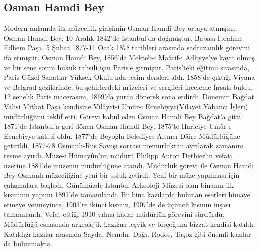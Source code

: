 \subsection{Osman Hamdi Bey}
\indent\indent Modern anlamda ilk müzecilik girişimin Osman Hamdi Bey ortaya atmıştır. Osman Hamdi Bey, 10 Aralık 1842'de İstanbul'da doğmuştur. Babası İbrahim Edhem Paşa, 5 Şubat 1877-11 Ocak 1878 tarihleri arasında sadrazamlık görevini ifa etmiştir. Osman Hamdi Bey, 1856'da Mekteb-i Ma\^{a}rif-i Adliyye'ye kayıt olmuş ve bir sene sonra hukuk tahsili için Paris'e gitmiştir. Paris'teki eğitimi sırasında, Paris Güzel Sanatlar Yüksek Okulu'nda resim dersleri aldı. 1858'de çıktığı Viyana ve Belgrad gezilerinde, bu şehirlerdeki müzeleri ve sergileri inceleme fırsatı buldu. 12 senelik Paris macerasını, 1869'da yurda dönerek sona erdirdi. Dönemin Bağdat Valisi Mithat Paşa kendisine Vil\^{a}yet-i Um\^{u}r-ı Ecnebiyye(Vilayet Yabancı İşleri) müdürlüğünü teklif etti. Görevi kabul eden Osman Hamdi Bey Bağdat'a gitti. 1871'de İstanbul'a geri dönen Osman Hamdi Bey, 1875'te Hariciye Um\^{u}r-ı Ecnebiyye k\^{a}tibi oldu. 1877'de Beyoğlu Belediyes Altıncı D\^{a}ire Müdürlüğüne getirildi. 1877-78 Osmanlı-Rus Savaşı sonrası memurluktan ayrılarak zamanını resme ayırdı. Müze-i Hümay\^{u}n'un müdürü Philipp Anton Dethier'in vefatı üzerine 1881'de müzenin müdürlüğüne atandı.\newline
\indent Müdürlük görevi ile Osman Hamdi Bey Osmanlı müzeciliğine yeni bir soluk getirdi. Yeni bir müze yapılması için çalışmalara başladı. Günümüzde İstanbul Arkeoloji Müzesi olan binanın ilk kısmının yapımı 1891'de tamamlandı. Bu bina kazılarda bulunan eserleri himaye etmeye yetmeyince, 1903'te ikinci kısmın, 1907'de de üçüncü kısmın inşası tamamlandı. Vefat ettiği 1910 yılına kadar müdürlük görevini sürdürdü. Müdürlüğü esnasında arkeolojik kazıları teşvik ve birçoğuna bizzat kendisi katıldı. Katıldığı kazılar arasında Sayda, Nemdur Dağı, Rodos, Taşoz gibi önemli kazılar da bulunmakta.\cite{dia_1}